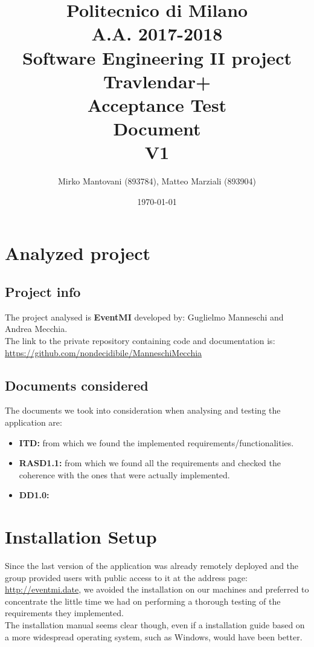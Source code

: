 \documentclass{article}
\author{Mirko Mantovani (893784), Matteo Marziali (893904)}
\date{\today}
\title{Politecnico di Milano
	\\A.A. 2017\@-\@2018
	\\Software Engineering II project \\ \textbf{Travlendar+}
	\\
	\textbf{A}cceptance \textbf{T}est 
	\\ \textbf{D}ocument 
	\\
	\textbf{V1}}
\begin{document}
\maketitle
\begin{center}
\end{center}
\clearpage
{\hypersetup{hidelinks}\tableofcontents}


\clearpage
\section{Analyzed project}
\subsection{Project info}
The project analysed is \textbf{EventMI} developed by: Guglielmo Manneschi and Andrea Mecchia.
\\The link to the private repository containing code and documentation is: \\
\href{url}{https://github.com/nondecidibile/ManneschiMecchia}

\subsection{Documents considered}
The documents we took into consideration when analysing and testing the application are:
\begin{itemize}
\item \textbf{ITD:} from which we found the implemented requirements/functionalities.
\item \textbf{RASD1.1:} from which we found all the requirements and checked the coherence with the ones that were actually implemented.
\item \textbf{DD1.0:}
\end{itemize}


\clearpage
\section{Installation Setup}
Since the last version of the application was already remotely deployed and the group provided users with public access to it at the address page: \href{url}{http://eventmi.date}, we avoided the installation on our machines and preferred to concentrate the little time we had on performing a thorough testing of the requirements they implemented.\\ The installation manual seems clear though, even if a installation guide based on a more widespread operating system, such as Windows, would have been better.
\end{document}
